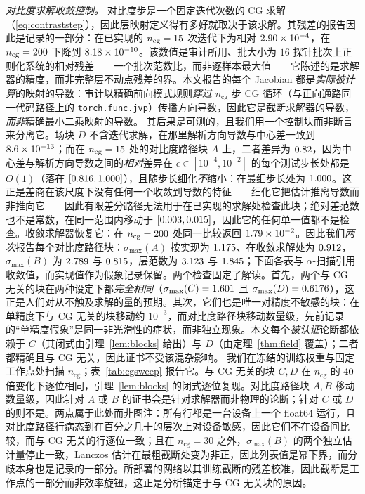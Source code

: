 \documentclass[UTF8,a4paper,11pt]{ctexart}
\newcommand{\numv}[1]{#1}
\begin{document}
\emph{对比度求解收敛控制。} 对比度步是一个固定迭代次数的 CG 求解（\eqref{eq:contraststep}），因此层映射定义得有多好就取决于该求解。其残差的报告因此是记录的一部分：在已实现的 $n_{\mathrm{cg}}=\numv{\NumNCg}$ 次迭代下为相对 $\numv{\NumCgResidImpl}$，在 $n_{\mathrm{cg}}=\numv{\NumNCgConv}$ 下降到 $\numv{\NumCgResidConv}$。该数值是审计所用、批大小为 $16$ 探针批次上正则化系统的相对残差——一个批次范数比，而非逐样本最大值——它陈述的是求解器的精度，而非完整层不动点残差的界。本文报告的每个 Jacobian 都是\emph{实际被计算}的映射的导数：审计以精确前向模式规则\emph{穿过} $n_{\mathrm{cg}}$ 步 CG 循环（与正向通路同一代码路径上的 \texttt{torch.func.jvp}）传播方向导数，因此它是截断求解器的导数，\emph{而非}精确最小二乘映射的导数。
其后果是可测的，且我们用一个控制块而非断言来分离它。场块 $D$ 不含迭代求解，在那里解析方向导数与中心差一致到 $\numv{\NumFdBlockD}$；而在 $n_{\mathrm{cg}}=\numv{\NumNCg}$ 处的对比度路径块 $A$ 上，二者差异为 $\numv{\NumFdBlockAImpl}$，因为中心差与解析方向导数之间的\emph{相对}差异在 $\epsilon\in[10^{-4},10^{-2}]$ 的每个测试步长处都是 $O(1)$（落在 $[\numv{\NumDfRelAImplLo},\numv{\NumDfRelAImplHi}]$），且随步长细化\emph{不}缩小：在最细步长处为 $\numv{\NumDfRelAFine}$。这正是差商在该尺度下没有任何一个收敛到导数的特征——细化它把估计推离导数而非推向它——因此有限差分路径无法用于在已实现的求解处检查此块；绝对差范数也不是常数，在同一范围内移动于 $[\numv{\NumDfAbsAImplLo},\numv{\NumDfAbsAImplHi}]$，因此它的任何单一值都不是检查。收敛求解器恢复它：在 $n_{\mathrm{cg}}=\numv{\NumNCgConv}$ 处同一比较返回 $\numv{\NumFdBlockAConv}$。因此我们\emph{两次}报告每个对比度路径块：$\sigma_{\max}(A)$ 按实现为 $\numv{\NumSigAImpl}$、在收敛求解处为 $\numv{\NumSigA}$，$\sigma_{\max}(B)$ 为 $\numv{\NumSigBImpl}$ 与 $\numv{\NumSigB}$，层范数为 $\numv{\NumSigmaFullImpl}$ 与 $\numv{\NumPhysSigma}$；下面各表与 $\alpha$-扫描引用收敛值，而实现值作为假象记录保留。两个检查固定了解读。首先，两个与 CG 无关的块在两种设定下都\emph{完全相同}（$\sigma_{\max}(C)=\numv{\NumSigC}$ 且 $\sigma_{\max}(D)=\numv{\NumPhysWBlock}$），这正是人们对从不触及求解的量的预期。其次，它们也是唯一对精度不敏感的块：在单精度下与 CG 无关的块移动约 $10^{-3}$，而对比度路径块移动数量级，先前记录的“单精度假象”是同一非光滑性的症状，而非独立现象。本文每个\emph{被认证}论断都依赖于 $C$（其闭式由引理~\ref{lem:blocks} 给出）与 $D$（由定理~\ref{thm:field} 覆盖）；二者都精确且与 CG 无关，因此证书不受该混杂影响。
\label{sec:cgsweep}
我们在冻结的训练权重与固定工作点处扫描 $n_{\mathrm{cg}}$；表~\ref{tab:cgsweep} 报告它。与 CG 无关的块 $C,D$ 在 $n_{\mathrm{cg}}$ 的 $\numv{\NumCgRatio}$ 倍变化下逐位相同，引理~\ref{lem:blocks} 的闭式逐位复现。对比度路径块 $A,B$ 移动数量级，因此针对 $A$ 或 $B$ 的证书会是针对求解器而非物理的论断；针对 $C$ 或 $D$ 的则不是。两点属于此处而非图注：所有行都是一台设备上一个 float64 运行，且对比度路径行病态到在百分之几十的层次上对设备敏感，因此它们不在设备间比较，而与 CG 无关的行逐位一致；且在 $n_{\mathrm{cg}}=30$ 之外，$\sigma_{\max}(B)$ 的两个独立估计量停止一致，Lanczos 估计在最粗截断处变为非正，因此列表值是幂下界，而分歧本身也是记录的一部分。所部署的网络以其训练截断的残差校准，因此截断是工作点的一部分而非效率旋钮，这正是分析锚定于与 CG 无关块的原因。
\end{document}
